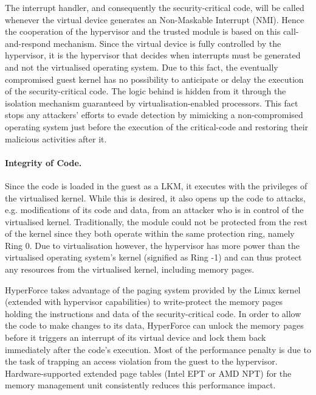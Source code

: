  
The interrupt handler, and consequently the security-critical code, will be called whenever the virtual device generates an Non-Maskable Interrupt (NMI). Hence the cooperation of the hypervisor and the trusted module is based on this call-and-respond mechanism.
Since the virtual device is fully controlled by the hypervisor, it is the hypervisor that decides when interrupts must be generated and not the virtualised operating system. Due to this fact, the eventually compromised guest kernel has no possibility to anticipate or delay the execution of the security-critical code. The logic behind is hidden from it through the isolation mechanism guaranteed by virtualisation-enabled processors.  
This fact stops any attackers' efforts to evade detection by mimicking a non-compromised operating system just before the execution of the critical-code and restoring their malicious activities after it.

\paragraph{Integrity of Code.}
Since the code is loaded in the guest as a LKM, it executes with the privileges of the virtualised kernel. While this is desired, it also opens up the code to attacks, e.g. modifications of its code and data, from an attacker who is in control of the virtualised kernel. 
Traditionally, the module could not be protected from the rest of the kernel since they both operate within the same protection ring, namely Ring 0. 
Due to virtualisation however, the hypervisor has more power than the virtualised operating system's kernel (signified as Ring -1) and can thus protect any resources from the virtualised kernel, including memory pages. 

HyperForce takes advantage of the paging system provided by the Linux kernel (extended with hypervisor capabilities) to write-protect the memory pages holding the instructions and data of the security-critical code. 
In order to allow the code to make changes to its data, HyperForce can unlock the memory pages before it triggers an interrupt of its virtual device and lock them back immediately after the code's execution. 
Most of the performance penalty is due to the task of trapping an access violation from the guest to the hypervisor. Hardware-supported extended page tables (Intel EPT or AMD NPT) for the memory management unit consistently reduces this performance impact.

